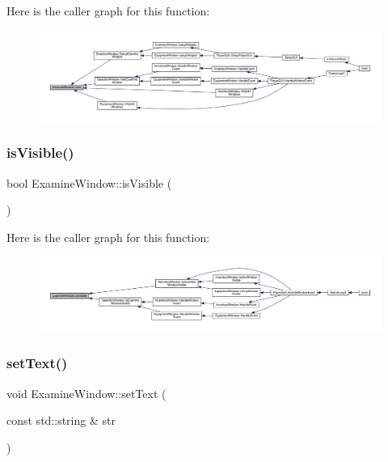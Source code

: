 Here is the caller graph for this function\+:
\nopagebreak
\begin{figure}[H]
\begin{center}
\leavevmode
\includegraphics[width=350pt]{d0/d28/class_examine_window_a43f65ea7b98e29f773cdf0098ab0ed9c_icgraph}
\end{center}
\end{figure}
\mbox{\label{class_examine_window_a71b248a6336a0626d8f6593921ecf2bd}} 
\subsubsection{\texorpdfstring{is\+Visible()}{isVisible()}}
{\footnotesize\ttfamily bool Examine\+Window\+::is\+Visible (\begin{DoxyParamCaption}{ }\end{DoxyParamCaption})}

Here is the caller graph for this function\+:
\nopagebreak
\begin{figure}[H]
\begin{center}
\leavevmode
\includegraphics[width=350pt]{d0/d28/class_examine_window_a71b248a6336a0626d8f6593921ecf2bd_icgraph}
\end{center}
\end{figure}
\mbox{\label{class_examine_window_ab88efb6bed6125a0c941ce70a360baf0}} 
\subsubsection{\texorpdfstring{set\+Text()}{setText()}}
{\footnotesize\ttfamily void Examine\+Window\+::set\+Text (\begin{DoxyParamCaption}\item[{const std\+::string \&}]{str }\end{DoxyParamCaption})}

